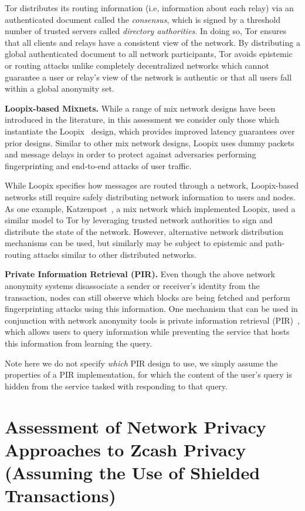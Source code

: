 \documentclass{article}
\begin{document}
Tor distributes its routing information (i.e, information about each relay) via
an authenticated document called the \emph{consensus}, which is signed by a
threshold number of trusted servers called \emph{directory authorities}. In
doing so, Tor ensures that all clients and relays have a consistent view of the
network. By distributing a global authenticated document to all network
participants, Tor avoids epistemic or routing attacks unlike completely
decentralized networks which cannot guarantee a user or relay's view of the
network is authentic or that all users fall within a global anonymity set.


\textbf{Loopix-based Mixnets.}
While a range of mix network designs have been introduced in the literature, in
this assessment we consider only those which instantiate the
Loopix~\cite{Piotrowska:2017:LAS} design, which provides improved latency
guarantees over prior designs. Similar to other mix network designs, Loopix
uses dummy packets and message delays in order to protect against adversaries
performing fingerprinting and end-to-end attacks of user traffic.

While Loopix specifies how messages are routed through a network, Loopix-based
networks still require safely distributing network information to users and
nodes. As one example, Katzenpost~\cite{katzenpost}, a mix network which implemented
Loopix,  used a similar model to Tor
by leveraging trusted network authorities to sign and distribute the state of
the network. However, alternative network distribution mechanisms can be used,
but similarly may be subject to epistemic and path-routing attacks similar to
other distributed networks.

\textbf{Private Information Retrieval (PIR).}
Even though the above network anonymity systems disassociate a sender or
receiver's identity from the transaction, nodes can still observe which blocks
are being fetched and perform fingerprinting attacks using this information.
One mechanism that can be used in conjunction with network anonymity tools is
private information retrieval (PIR)~\cite{pir}, which allows users to query information
while preventing the service that hosts this information from learning the
query.

Note here we do not specify \emph{which} PIR design to use, we simply assume
the properties of a PIR implementation, for which the content of the user's
query is hidden from the service tasked with responding to that query.


\section{Assessment of Network Privacy Approaches to Zcash Privacy (Assuming
the Use of Shielded Transactions)}
\label{network-privacy-assessment}
\end{document}
